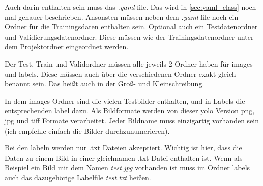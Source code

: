 Auch darin enthalten sein muss das \textit{.yaml} file. Das wird in \autoref{sec:yaml_class} noch mal genauer beschrieben. Ansonsten müssen neben dem \textit{.yaml} file noch ein Ordner für die Trainingsdaten enthalten sein. Optional auch ein Testdatenordner und Validierungsdatenordner. Diese müssen wie der Trainingsdatenordner unter dem Projektordner eingeordnet werden.

Der Test, Train und Validordner müssen alle jeweils 2 Ordner haben für images und labels. Diese müssen auch über die verschiedenen Ordner exakt gleich benannt sein. Das heißt auch in der Groß- und Kleinschreibung. 

In dem images Ordner sind die vielen Testbilder enthalten, und in Labels die entsprechenden label dazu. Als Bildformate werden von dieser \ac{yolo} Version png, jpg und tiff Formate verarbeitet. Jeder Bildname muss einzigartig vorhanden sein (ich empfehle einfach die Bilder durchzunumerieren).

Bei den labeln werden nur .txt Dateien akzeptiert. Wichtig ist hier, dass die Daten zu einem Bild in einer gleichnamen .txt-Datei enthalten ist. Wenn als Beispiel ein Bild mit dem Namen \textit{test.jpg} vorhanden ist muss im Ordner labels auch das dazugehörige Labelfile \textit{test.txt} heißen.


